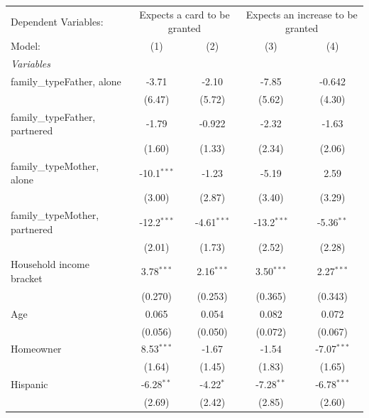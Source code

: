 
\begingroup
\centering
\begin{tabular}{lcccc}
   \tabularnewline \midrule \midrule
   Dependent Variables: & \multicolumn{2}{c}{Expects a card to be granted} & \multicolumn{2}{c}{Expects an increase to be granted}\\
   Model:                         & (1)           & (2)           & (3)           & (4)\\  
   \midrule
   \emph{Variables}\\
   family\_typeFather, alone      & -3.71         & -2.10         & -7.85         & -0.642\\   
                                  & (6.47)        & (5.72)        & (5.62)        & (4.30)\\   
   family\_typeFather, partnered  & -1.79         & -0.922        & -2.32         & -1.63\\   
                                  & (1.60)        & (1.33)        & (2.34)        & (2.06)\\   
   family\_typeMother, alone      & -10.1$^{***}$ & -1.23         & -5.19         & 2.59\\   
                                  & (3.00)        & (2.87)        & (3.40)        & (3.29)\\   
   family\_typeMother, partnered  & -12.2$^{***}$ & -4.61$^{***}$ & -13.2$^{***}$ & -5.36$^{**}$\\   
                                  & (2.01)        & (1.73)        & (2.52)        & (2.28)\\   
   Household income bracket       & 3.78$^{***}$  & 2.16$^{***}$  & 3.50$^{***}$  & 2.27$^{***}$\\   
                                  & (0.270)       & (0.253)       & (0.365)       & (0.343)\\   
   Age                            & 0.065         & 0.054         & 0.082         & 0.072\\   
                                  & (0.056)       & (0.050)       & (0.072)       & (0.067)\\   
   Homeowner                      & 8.53$^{***}$  & -1.67         & -1.54         & -7.07$^{***}$\\   
                                  & (1.64)        & (1.45)        & (1.83)        & (1.65)\\   
   Hispanic                       & -6.28$^{**}$  & -4.22$^{*}$   & -7.28$^{**}$  & -6.78$^{***}$\\   
                                  & (2.69)        & (2.42)        & (2.85)        & (2.60)\\   

\end{tabular}
